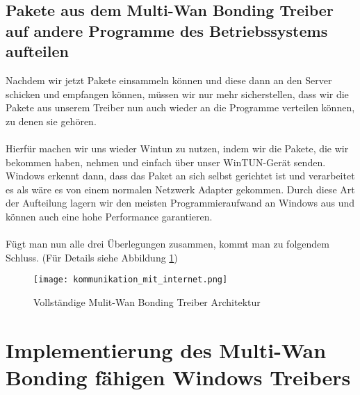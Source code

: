 \subsection{Pakete aus dem Multi-Wan Bonding Treiber auf andere Programme des Betriebssystems aufteilen}
Nachdem wir jetzt Pakete einsammeln können und diese dann an den Server schicken und empfangen können, müssen wir nur mehr sicherstellen, dass wir die Pakete aus unserem Treiber nun auch wieder an die Programme verteilen können, zu denen sie gehören.
\\\\
Hierfür machen wir uns wieder Wintun zu nutzen, indem wir die Pakete, die wir bekommen haben, nehmen und einfach über unser WinTUN-Gerät senden. Windows erkennt dann, dass das Paket an sich selbst gerichtet ist und verarbeitet es als wäre es von einem normalen Netzwerk Adapter gekommen. Durch diese Art der Aufteilung lagern wir den meisten Programmieraufwand an Windows aus und können auch eine hohe Performance garantieren.
\\\\
Fügt man nun alle drei Überlegungen zusammen, kommt man zu folgendem Schluss. (Für Details siehe Abbildung \ref{driver-full-architecture})
\begin{figure}[H]
    \centering
    \texttt{[image: kommunikation\_mit\_internet.png]}
    \caption[Vollständige Mulit-Wan Bonding Treiber Architektur]{Vollständige Mulit-Wan Bonding Treiber Architektur}
    \label{driver-full-architecture}
\end{figure}
\noindent

\newpage
\section{Implementierung des Multi-Wan Bonding fähigen Windows Treibers}
